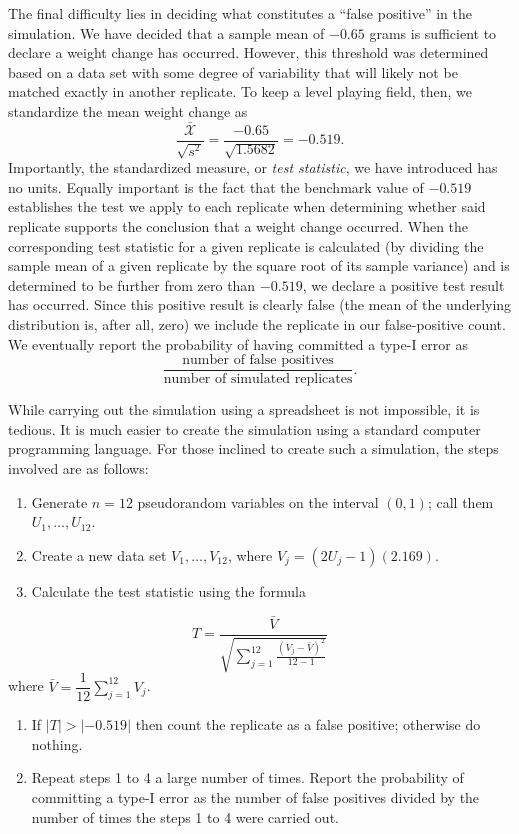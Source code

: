 \documentclass[../book.tex]{subfiles}
\begin{document}
\begin{solution}
The final difficulty lies in deciding what constitutes a ``false positive'' in the simulation. We have decided that a sample mean of \(-0.65\) grams is sufficient to declare a weight change has occurred. However, this threshold was determined based on a data set with some degree of variability that will likely not be matched exactly in another replicate. To keep a level playing field, then, we standardize the mean weight change as
\begin{equation}\label{eq:rv-27}
\frac{\bar{\mathcal{X}}}{\sqrt{s^2}} = \frac{-0.65}{\sqrt{1.5682}} = -0.519.
\end{equation}
Importantly, the standardized measure, or \emph{test statistic}, we have introduced has no units. Equally important is the fact that the benchmark value of \(-0.519\) establishes the test we apply to each replicate when determining whether said replicate supports the conclusion that a weight change occurred. When the corresponding test statistic for a given replicate is calculated (by dividing the sample mean of a given replicate by the square root of its sample variance) and is determined to be further from zero than \(-0.519\), we declare a positive test result has occurred. Since this positive result is clearly false (the mean of the underlying distribution is, after all, zero) we include the replicate in our false-positive count. We eventually report the probability of having committed a type-I error as
\begin{equation}\label{eq:rv-28}
\frac{\text{number of false positives}}{\text{number of simulated replicates}}.
\end{equation}

While carrying out the simulation using a spreadsheet is not impossible, it is tedious. It is much easier to create the simulation using a standard computer programming language. For those inclined to create such a simulation, the steps involved are as follows:

\begin{enumerate}
  \item Generate \(n=12\) pseudorandom variables on the interval \((0,1)\); call them \(U_1, \dots, U_{12}\).
  \item Create a new data set \(V_1, \ldots, V_{12}\), where \(V_j = (2 U_j - 1) (2.169)\).
  \item Calculate the test statistic using the formula
\end{enumerate}
\begin{equation}\label{eq:rv-29}
T = \frac{ \bar V } {\displaystyle \sqrt{ \sum_{j=1}^{12} \frac{(V_j - \bar V)^2}{12-1}}
}
\end{equation}
where \(\bar V = \dfrac{1}{12}\displaystyle\sum_{j=1}^{12} V_j\).
\begin{enumerate}
  \item If \(|T| > |-0.519|\) then count the replicate as a false positive; otherwise do nothing.
  \item Repeat steps 1 to 4 a large number of times. Report the probability of committing a type-I error as the number of false positives divided by the number of times the steps 1 to 4 were carried out.
\end{enumerate}


\end{solution}
\end{document}
